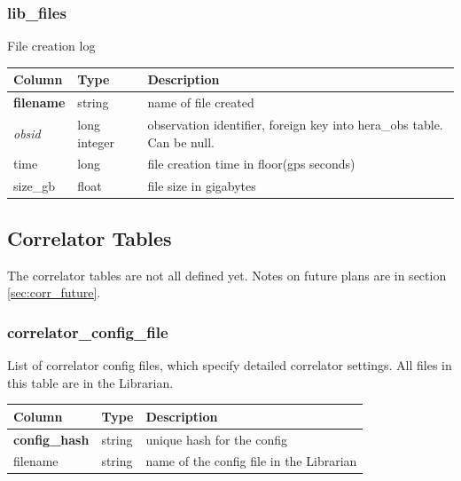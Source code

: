 \documentclass{article}
\begin{document}
{\subsubsection{lib\_files}
File creation log
\begin{center}
 \begin{tabular}{| p{4cm} | p{2cm} | p{10cm} |}
\hline
 {\bf Column} & {\bf Type}  & {\bf Description} \\ [0.5ex]  \hline\hline
\textbf{filename} & string & name of file created \\ \hline
\textit{obsid} & long integer & observation identifier, foreign key into hera\_obs table. Can be null. \\ \hline
time & long & file creation time in floor(gps seconds)\\ \hline
size\_gb & float & file size in gigabytes \\ \hline
\end{tabular}
\end{center}




\subsection{Correlator Tables}
The correlator tables are not all defined yet. Notes on future plans are in section \ref{sec:corr_future}.


\subsubsection{correlator\_config\_file}
List of correlator config files, which specify detailed correlator settings. All files in this table are in the Librarian.
\begin{center}
 \begin{tabular}{| p{4cm} | p{2cm} | p{10cm} |}
\hline
 {\bf Column} & {\bf Type}  & {\bf Description} \\ [0.5ex]  \hline\hline
\textbf{config\_hash} & string & unique hash for the config\\ \hline
filename & string & name of the config file in the Librarian \\\hline
\end{tabular}
\end{center}

}
\end{document}
